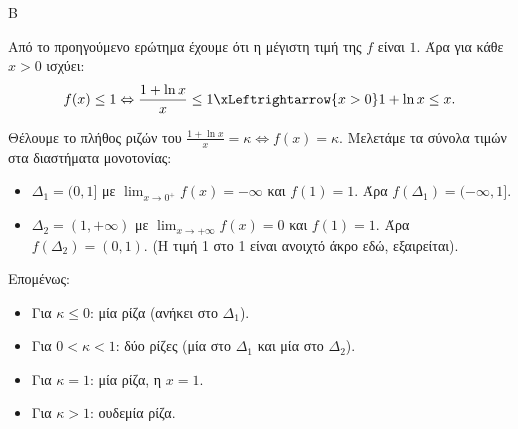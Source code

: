 \begin{thema}{Β}
\begin{erwthma}
\item Από το προηγούμενο ερώτημα έχουμε ότι η μέγιστη τιμή της $f$ είναι $1$. Άρα για κάθε $x>0$ ισχύει:
\[ f(x) \le 1 \Leftrightarrow \frac{1+\ln x}{x} \le 1 \xLeftrightarrow{x>0} 1+\ln x \le x. \]

\item Θέλουμε το πλήθος ριζών του $\frac{1+\ln x}{x} = \kappa \Leftrightarrow f(x) = \kappa$. 
Μελετάμε τα σύνολα τιμών στα διαστήματα μονοτονίας:
\begin{itemize}
\item $\Delta_1 = (0, 1]$ με $\lim_{x\to0^+} f(x) = -\infty$ και $f(1) = 1$. Άρα $f(\Delta_1) = (-\infty, 1]$.
\item $\Delta_2 = (1, +\infty)$ με $\lim_{x\to+\infty} f(x) = 0$ και $f(1) = 1$. Άρα $f(\Delta_2) = (0, 1)$. (Η τιμή 1 στο 1 είναι ανοιχτό άκρο εδώ, εξαιρείται).
\end{itemize}
Επομένως:
\begin{itemize}
\item Για $\kappa \le 0$: μία ρίζα (ανήκει στο $\Delta_1$).
\item Για $0 < \kappa < 1$: δύο ρίζες (μία στο $\Delta_1$ και μία στο $\Delta_2$).
\item Για $\kappa = 1$: μία ρίζα, η $x=1$.
\item Για $\kappa > 1$: ουδεμία ρίζα.
\end{itemize}
\end{erwthma}
\end{thema}

